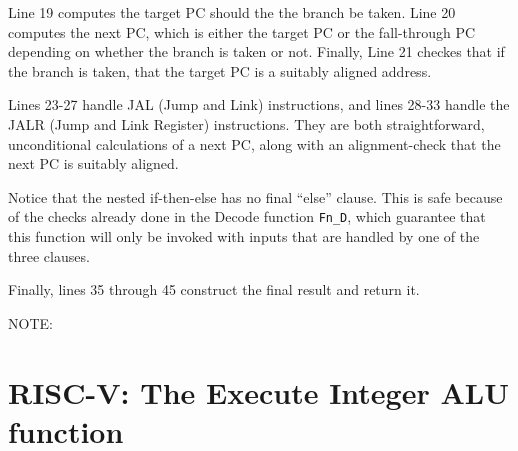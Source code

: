Line 19 computes the target PC should the the branch be taken.  Line
20 computes the next PC, which is either the target PC or the
fall-through PC depending on whether the branch is taken or not.
Finally, Line 21 checkes that if the branch is taken, that the target
PC is a suitably aligned address.

Lines 23-27 handle JAL (Jump and Link) instructions, and lines 28-33
handle the JALR (Jump and Link Register) instructions.  They are both
straightforward, unconditional calculations of a next PC, along with
an alignment-check that the next PC is suitably aligned.

Notice that the nested if-then-else has no final ``else'' clause.
This is safe because of the checks already done in the Decode function
\verb|Fn_D|, which guarantee that this function will only be invoked
with inputs that are handled by one of the three clauses.

Finally, lines 35 through 45 construct the final result and return it.

\vspace*{2ex}

NOTE:

\vspace*{2ex}


\section{RISC-V: The Execute Integer ALU function}

